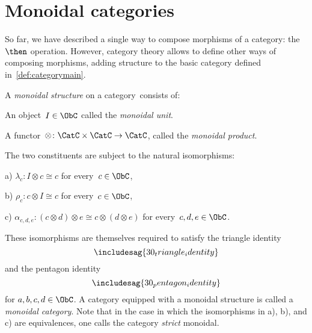 

\section{Monoidal categories}\label{sec:parallelism-mon-cat}
So far, we have described a single way to compose morphisms of a category: the~$\then$ operation. However, category theory allows to define other ways of composing morphisms, adding structure to the basic category defined in~\cref{def:categorymain}.
\begin{ctdefinition}
    \label{def:monoidal_cat}
    A \emph{monoidal structure} on a category~\CatC consists of:
    \begin{compactenum}
        \item An object~$I\in \ObC$ called the \emph{monoidal unit}.
        \item A functor~$\otimes \colon \CatC \times \CatC\to \CatC$, called the \emph{monoidal product}.
    \end{compactenum}
    The two constituents are subject to the natural isomorphisms:
    \begin{compactenum}
        \item[a)] $\lambda_c \colon I\otimes c \cong c$ for every~$c\in \ObC$,
        \item[b)] $\rho_c \colon c\otimes I \cong c$ for every~$c\in \ObC$,
        \item[c)] $\alpha_{c,d,e}\colon (c\otimes d)\otimes e \cong c\otimes (d\otimes e)$ for every~$c,d,e\in \ObC$.
    \end{compactenum}
    These isomorphisms are themselves required to satisfy the triangle identity
    \begin{equation}
        \includesag{30_triangle_identity}
    \end{equation}
    and the pentagon identity
    \begin{equation}
        \includesag{30_pentagon_identity}
    \end{equation}
    for $a,b,c,d\in \ObC$.
    \noindent A category equipped with a monoidal structure is called a \emph{monoidal category}. Note that in the case in which the isomorphisms in a), b), and c) are equivalences, one calls the category \emph{strict} monoidal.
\end{ctdefinition}

